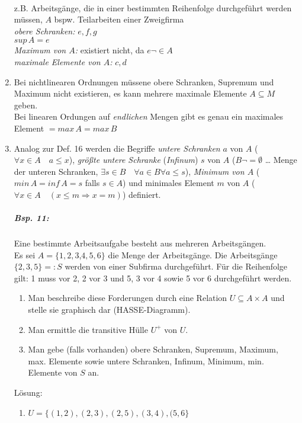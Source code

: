 \begin{enumerate}
\begin{tikzpicture}[scale=.5]
\end{tikzpicture}\\
z.B. Arbeitsgänge, die in einer bestimmten Reihenfolge durchgeführt werden müssen, $A$ bspw. Teilarbeiten einer Zweigfirma\\
\emph{obere Schranken:} $e,f,g$\\
\emph{$sup\, A$}$=e$\\
\emph{Maximum von $A$:} existiert nicht, da $e \neg \in A$\\
\emph{maximale Elemente von $A$:} $c,d$
\item Bei nichtlinearen Ordnungen müssene obere Schranken, Supremum und Maximum nicht existieren, es kann mehrere maximale Elemente $A\subseteq M$ geben.\\
Bei linearen Ordungen auf \emph{endlichen} Mengen gibt es genau ein maximales Element $=max\, A =max\, B$
\item Analog zur Def. 16 werden die Begriffe \emph{untere Schranken} $a$ von $A$ ($\forall x \in A \quad a \leq x$), \emph{größte untere Schranke} (\emph{Infinum}) $s$ von $A$ ($B\neg = \emptyset$ … Menge der unteren Schranken, $\exists s \in B \quad \forall a \in B \forall a \leq s$), \emph{Minimum von $A$} ($min \, A = inf\, A = s$ falls $s \in A$) und minimales Element $m$ von $A$ ($\forall x \in A \quad (x\leq m \Rightarrow x = m)$) definiert.
\subparagraph{Bsp. 11:} \parskp
Eine bestimmte Arbeitsaufgabe besteht aus mehreren Arbeitsgängen. \\
Es sei $A=\{1,2,3$,$4,5,6\}$ die Menge der Arbeitsgänge. Die Arbeitsgänge $\{2,3,5\}=:S$ werden von einer Subfirma durchgeführt. Für die Reihenfolge gilt: 1 muss vor 2, 2 vor 3 und 5, 3 vor 4 sowie 5 vor 6 durchgeführt werden.
\begin{enumerate}  [label=\alph*)]
\item Man beschreibe diese Forderungen durch eine Relation $U\subseteq A\times A$ und stelle sie graphisch dar (HASSE-Diagramm).
\item Man ermittle die transitive Hülle $U^+$ von $U$.
\item Man gebe (falls vorhanden) obere Schranken, Supremum, Maximum, max. Elemente sowie untere Schranken, Infinum, Minimum, min. Elemente von $S$ an.
\end{enumerate}
Lösung:
\begin{enumerate}   [label=\alph*)]
\item $U=\{(1,2),(2,3),(2,5),(3,4),(5,6\}$\\
\end{enumerate}
\end{enumerate}
